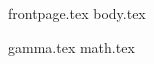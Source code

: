 \documentclass[runningheads]{llncs}
\begin{document}
{frontpage.tex}
{body.tex}

\iflncs
  
\fi
\ifoakland
  
\fi
\ifccs
  
\fi


\appendix

{gamma.tex}
{math.tex}
\end{document}
